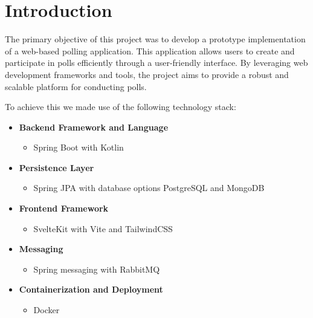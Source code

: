\section{Introduction}
\label{sec:introduction}

The primary objective of this project was to develop a prototype implementation of a web-based polling application.
This application allows users to create and participate in polls efficiently through a user-friendly interface. 
By leveraging web development frameworks and tools, the project aims to provide a robust and scalable platform for conducting polls.

To achieve this we made use of the following technology stack:

\begin{itemize}
    \item \textbf{Backend Framework and Language}
    \begin{itemize}
        \item Spring Boot with Kotlin
    \end{itemize}

    \item \textbf{Persistence Layer}
    \begin{itemize}
        \item Spring JPA  with database options PostgreSQL and MongoDB
    \end{itemize}

    \item \textbf{Frontend Framework}
    \begin{itemize}
        \item SvelteKit with Vite and TailwindCSS
    \end{itemize}

    \item \textbf{Messaging}
    \begin{itemize}
        \item Spring messaging with RabbitMQ
    \end{itemize}

    \item \textbf{Containerization and Deployment}
    \begin{itemize}
        \item Docker
    \end{itemize}
\end{itemize}

